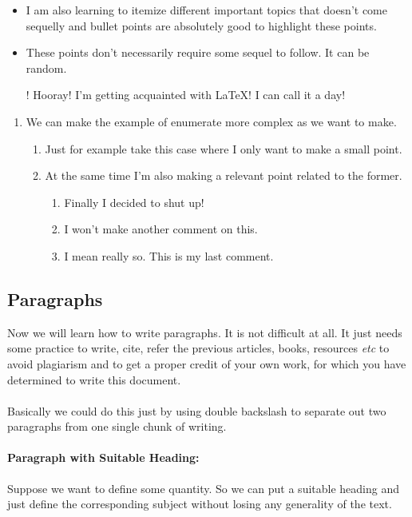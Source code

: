 \documentclass[onecolumn,12pt]{article}
\begin{document}
\begin{itemize}
\item I am also learning to itemize different important topics that doesn't come sequelly and bullet points are absolutely good to highlight these points.
\item These points don't necessarily require some sequel to follow. It can be random.
\item[!] Hooray! I'm getting acquainted with LaTeX! I can call it a day!
\end{itemize}
\begin{enumerate}
	\item We can make the example of enumerate more complex as we want to make.
	\begin{enumerate}
	\item Just for example take this case where I only want to make a small point.
	\item At the same time I'm also making a relevant point related to the former.
	    \begin{enumerate}
	    \item Finally I decided to shut up!
	    \item I won't make another comment on this.
	    \item I mean really so. This is my last comment.
	    \end{enumerate}
	\end{enumerate}	
\end{enumerate}

\subsection{Paragraphs}
Now we will learn how to write paragraphs. It is not difficult at all. It just needs some practice to write, cite, refer the previous articles, books, resources {\it etc} to avoid plagiarism and to get a proper credit of your own work, for which you have determined to write this document. \\ \ \\
Basically we could do this just by using double backslash to separate out two paragraphs from one single chunk of writing. 
\paragraph{Paragraph with Suitable Heading:}
Suppose we want to define some quantity. So we can put a suitable heading and just define the corresponding subject without losing any generality of the text.
\end{document}
